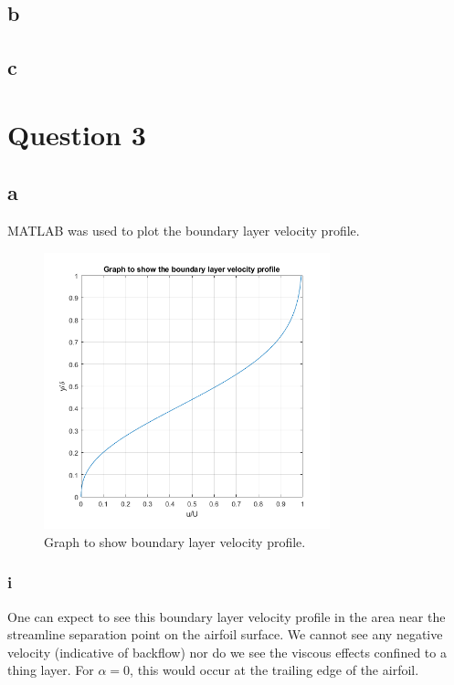 \documentclass[11pt]{article}
\numberwithin{equation}{section}
\begin{document}
\subsection{b}
\subsection{c}
\section{Question 3}
\subsection{a}
MATLAB was used to plot the boundary layer velocity profile.

\begin{figure}[H]
    \centering
    \includegraphics[height = 8cm]{./img/q3a.png}
    \caption{Graph to show boundary layer velocity profile.}
    \label{fig:q3a}
\end{figure}
\subsubsection{i}
One can expect to see this boundary layer velocity profile in the area  near the streamline separation point on the airfoil surface. We cannot see any negative velocity (indicative of backflow) nor do we see the viscous effects confined to a thing layer. For $\alpha = 0$, this would occur at the trailing edge of the airfoil. 
\end{document}
